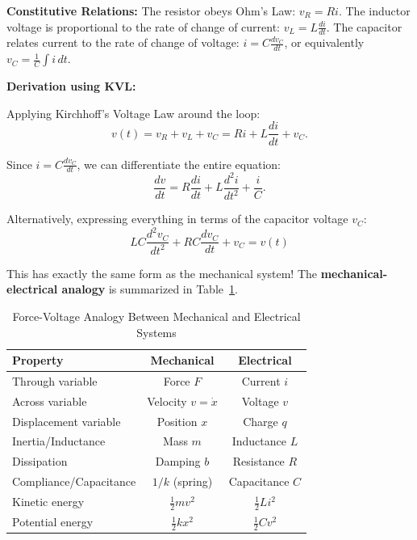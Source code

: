 \textbf{Constitutive Relations:} The resistor obeys Ohm's Law: $v_R = Ri$. The inductor voltage is proportional to the rate of change of current: $v_L = L\frac{di}{dt}$. The capacitor relates current to the rate of change of voltage: $i = C\frac{dv_C}{dt}$, or equivalently $v_C = \frac{1}{C}\int i \, dt$.

\textbf{Derivation using KVL:}

Applying Kirchhoff's Voltage Law around the loop:
\begin{equation}
v(t) = v_R + v_L + v_C = Ri + L\frac{di}{dt} + v_C.
\end{equation}

Since $i = C\frac{dv_C}{dt}$, we can differentiate the entire equation:
\begin{equation}
\frac{dv}{dt} = R\frac{di}{dt} + L\frac{d^2i}{dt^2} + \frac{i}{C}.
\end{equation}

Alternatively, expressing everything in terms of the capacitor voltage $v_C$:
\begin{equation}
\boxed{LC\frac{d^2v_C}{dt^2} + RC\frac{dv_C}{dt} + v_C = v(t)}
\label{eq:rlc_ode}
\end{equation}

This has exactly the same form as the mechanical system! The \textbf{mechanical-electrical analogy} is summarized in Table~\ref{tab:analogy}.

\begin{table}[htbp]
\centering
\caption{Force-Voltage Analogy Between Mechanical and Electrical Systems}
\label{tab:analogy}
\begin{tabular}{lcc}
\toprule
\textbf{Property} & \textbf{Mechanical} & \textbf{Electrical} \\
\midrule
Through variable & Force $F$ & Current $i$ \\
Across variable & Velocity $v = \dot{x}$ & Voltage $v$ \\
Displacement variable & Position $x$ & Charge $q$ \\
\midrule
Inertia/Inductance & Mass $m$ & Inductance $L$ \\
Dissipation & Damping $b$ & Resistance $R$ \\
Compliance/Capacitance & $1/k$ (spring) & Capacitance $C$ \\
\midrule
Kinetic energy & $\frac{1}{2}mv^2$ & $\frac{1}{2}Li^2$ \\
Potential energy & $\frac{1}{2}kx^2$ & $\frac{1}{2}Cv^2$ \\
\bottomrule
\end{tabular}
\end{table}

